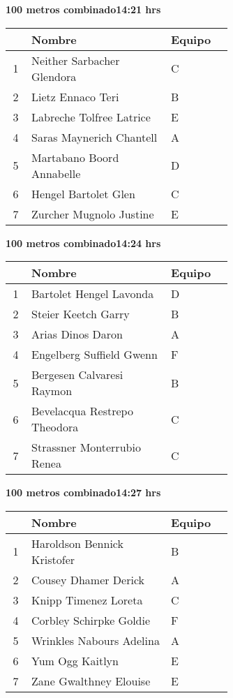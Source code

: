 \begin{minipage}{0.95\linewidth}
\begin{center}
\textbf{
100 metros combinado\hspace{1cm}14:21 hrs}
\end{center}
\begin{tabular}{cp{0.63\linewidth}l}
\hline
& \textbf{Nombre} & \textbf{Equipo} \\ \hline
1 & Neither Sarbacher Glendora & C \\ 
2 & Lietz Ennaco Teri & B \\ 
3 & Labreche Tolfree Latrice & E \\ 
4 & Saras Maynerich Chantell & A \\ 
5 & Martabano Boord Annabelle & D \\ 
6 & Hengel Bartolet Glen & C \\ 
7 & Zurcher Mugnolo Justine & E \\ 
\end{tabular}
\end{minipage}
\begin{minipage}{0.95\linewidth}
\begin{center}
\textbf{
100 metros combinado\hspace{1cm}14:24 hrs}
\end{center}
\begin{tabular}{cp{0.63\linewidth}l}
\hline
& \textbf{Nombre} & \textbf{Equipo} \\ \hline
1 & Bartolet Hengel Lavonda & D \\ 
2 & Steier Keetch Garry & B \\ 
3 & Arias Dinos Daron & A \\ 
4 & Engelberg Suffield Gwenn & F \\ 
5 & Bergesen Calvaresi Raymon & B \\ 
6 & Bevelacqua Restrepo Theodora & C \\ 
7 & Strassner Monterrubio Renea & C \\ 
\end{tabular}
\end{minipage}
\begin{minipage}{0.95\linewidth}
\begin{center}
\textbf{
100 metros combinado\hspace{1cm}14:27 hrs}
\end{center}
\begin{tabular}{cp{0.63\linewidth}l}
\hline
& \textbf{Nombre} & \textbf{Equipo} \\ \hline
1 & Haroldson Bennick Kristofer & B \\ 
2 & Cousey Dhamer Derick & A \\ 
3 & Knipp Timenez Loreta & C \\ 
4 & Corbley Schirpke Goldie & F \\ 
5 & Wrinkles Nabours Adelina & A \\ 
6 & Yum Ogg Kaitlyn & E \\ 
7 & Zane Gwalthney Elouise & E \\ 
\end{tabular}
\end{minipage}
